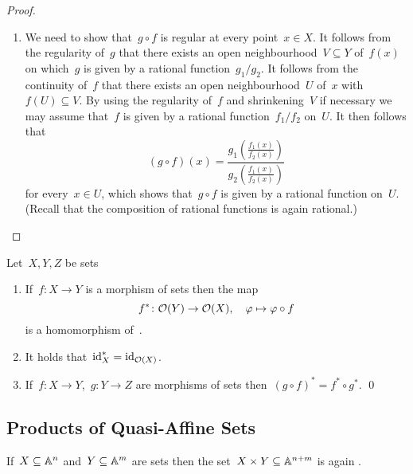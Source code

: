 \begin{proof}
  \leavevmode
  \begin{enumerate}[start=2]
    \item
      We need to show that~$g \circ f$ is regular at every point~$x \in X$.
      It follows from the regularity of~$g$ that there exists an open neighbourhood~$V \subseteq Y$ of~$f(x)$ on which~$g$ is given by a rational function~$g_1/g_2$.
      It follows from the continuity of~$f$ that there exists an open neighbourhood~$U$ of~$x$ with~$f(U) \subseteq V$.
      By using the regularity of~$f$ and shrinkening~$V$ if necessary we may assume that~$f$ is given by a rational function~$f_1/f_2$ on~$U$.
      It then follows that
      \[
          (g \circ f)(x)
        = \frac{ g_1\left( \frac{f_1(x)}{f_2(x)} \right) }{ g_2\left( \frac{f_1(x)}{f_2(x)} \right) }
      \]
      for every~$x \in U$, which shows that~$g \circ f$ is given by a rational function on~$U$.
      (Recall that the composition of rational functions is again rational.)
    \qedhere
  \end{enumerate}
\end{proof}



\begin{lemma}
  Let~$X, Y, Z$ be {\qaffine} sets
  \begin{enumerate}
    \item
      If~$f \colon X \to Y$ is a morphism of {\qaffine} sets then the map
      \[
                  f^*
        \colon    \mathcal{O}(Y)
        \to       \mathcal{O}(X),
        \quad     \varphi
        \mapsto   \varphi \circ f
      \]
      is a homomorphism of~.
    \item
      It holds that~$\operatorname{id}_X^* = \operatorname{id}_{\mathcal{O}(X)}$.
    \item
      If~$f \colon X \to Y$,~$g \colon Y \to Z$ are morphisms of {\qaffine} sets then~$(g \circ f)^* = f^* \circ g^*$.
    \qed
  \end{enumerate}
\end{lemma}




\subsection{Products of Quasi-Affine Sets}


\begin{lemma}
  If~$X \subseteq \mathbb{A}^n$ and~$Y \subseteq \mathbb{A}^m$ are {\qaffine} sets then the set~$X \times Y \subseteq \mathbb{A}^{n+m}$ is again {\qaffine}.
\end{lemma}


